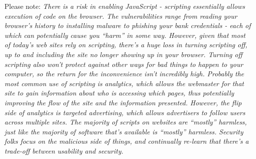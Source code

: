 \vspace{0.3cm}
Please note:
\textit{There is a risk in enabling JavaScript - scripting essentially allows execution of code on the browser. The vulnerabilities range from reading your browser's history to installing malware to phishing your bank credentials - each of which can potentially cause you ``harm'' in some way. However, given that most of today's web sites rely on scripting, there's a huge loss in turning scripting off, up to and including the site no longer showing up in your browser. Turning off scripting also won't protect against other ways for bad things to happen to your computer, so the return for the inconvenience isn't incredibly high. Probably the most common use of scripting is analytics, which allows the webmaster for that site to gain information about who is accessing which pages, thus potentially improving the flow of the site and the information presented. However, the flip side of analytics is targeted advertising, which allows advertisers to follow users across multiple sites. The majority of scripts on websites are ``mostly'' harmless, just like the majority of software that's available is ``mostly'' harmless. Security folks focus on the malicious side of things, and continually re-learn that there's a trade-off between usability and security.}

